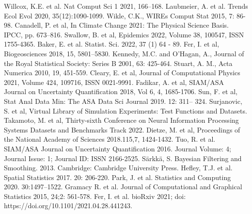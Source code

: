 \documentclass[11pt]{article}
\begin{document}
\begin{thebibliography}{20}
 Willcox, K.E. et al. Nat Comput Sci 1 2021, 166–168.
 Laubmeier, A. et al. Trends Ecol Evol 2020, 35(12):1090-1099.
 Wikle, C.K.,  WIREs Comput Stat 2015, 7: 86-98.
 Canadell, P. et al, In Climate Change 2021: The Physical Science Basis. IPCC, pp. 673–816.
 Swallow, B. et al, Epidemics 2022, Volume 38, 100547, ISSN 1755-4365.
 Baker, E. et al. Statist. Sci. 2022, 37 (1) 64 - 89.
 Fer, I. et al, Biogeosciences 2018, 15, 5801–5830.
 Kennedy, M.C. and O'Hagan, A., Journal of the Royal Statistical Society: Series B 2001, 63: 425-464.
 Stuart, A. M., Acta Numerica 2010, 19, 451-559. 
 Cleary, E. et al, Journal of Computational Physics 2021, Volume 424, 109716, ISSN 0021-9991.
 Fadikar, A. et al, SIAM/ASA Journal on Uncertainty Quantification 2018, Vol 6, 4, 1685-1706.
 Sun, F. et al, Stat Anal Data Min: The ASA Data Sci Journal 2019. 12: 311– 324. 
 Surjanovic, S. et al, Virtual Library of Simulation Experiments: Test Functions and Datasets.
 Takamoto, M. et al, Thirty-sixth Conference on Neural Information Processing Systems Datasets and Benchmarks Track 2022.
 Dietze, M. et al, Proceedings of the National Academy of Sciences 2018.115,7, 1424-1432.
 Tuo, R. et al. SIAM/ASA Journal on Uncertainty Quantification 2016. Journal Volume: 4; Journal Issue: 1; Journal ID: ISSN 2166-2525.
 Särkkä, S. Bayesian Filtering and Smoothing. 2013. Cambridge: Cambridge University Press.
 Hefley, T.J. et al. Spatial Statistics 2017. 20: 206-220.
 Park, J. et al. Statistics and Computing 2020. 30:1497–1522.
 Gramacy R. et al. Journal of Computational and Graphical Statistics 2015, 24;2: 561-578.
 Fer, I. et al. bioRxiv 2021; doi: https://doi.org/10.1101/2021.04.28.441243. 





\end{thebibliography}
\end{document}
